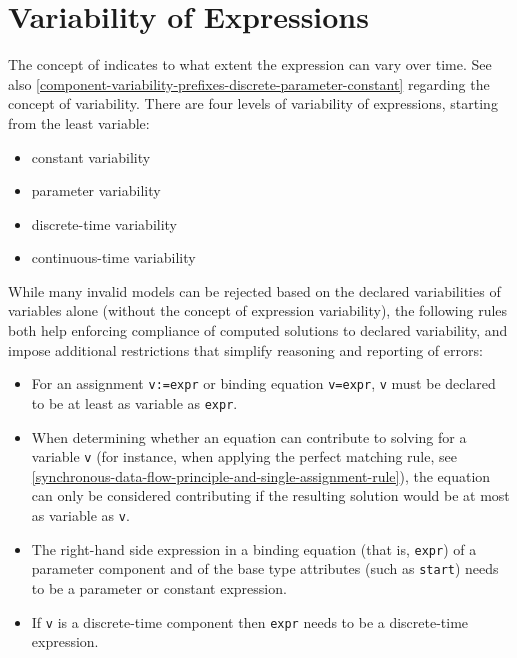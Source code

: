 \section{Variability of Expressions}\label{variability-of-expressions}

The concept of  indicates to what extent the expression can vary over time.
See also \cref{component-variability-prefixes-discrete-parameter-constant} regarding the concept of variability.
There are four levels of variability of expressions, starting from the least variable:
\begin{itemize}
\item
  constant variability
\item
  parameter variability
\item
  discrete-time variability
\item
  continuous-time variability
\end{itemize}

While many invalid models can be rejected based on the declared variabilities of variables alone (without the concept of expression
variability), the following rules both help enforcing compliance of computed solutions to declared variability, and impose additional
restrictions that simplify reasoning and reporting of errors:
\begin{itemize}
\item
  For an assignment \lstinline!v:=expr! or binding equation \lstinline!v=expr!, \lstinline!v! must be declared
  to be at least as variable as \lstinline!expr!.
\item
  When determining whether an equation can contribute to solving for a variable \lstinline!v! (for instance,
  when applying the perfect matching rule, see \cref{synchronous-data-flow-principle-and-single-assignment-rule}),
  the equation can only be considered contributing if the resulting solution would be at most as variable as \lstinline!v!.
\item
  The right-hand side expression in a binding equation (that is, \lstinline!expr!) of a parameter component and of the base type attributes
  (such as \lstinline!start!) needs to be a parameter or constant expression.
\item
  If \lstinline!v! is a discrete-time component then \lstinline!expr! needs to be a
  discrete-time expression.
\end{itemize}

